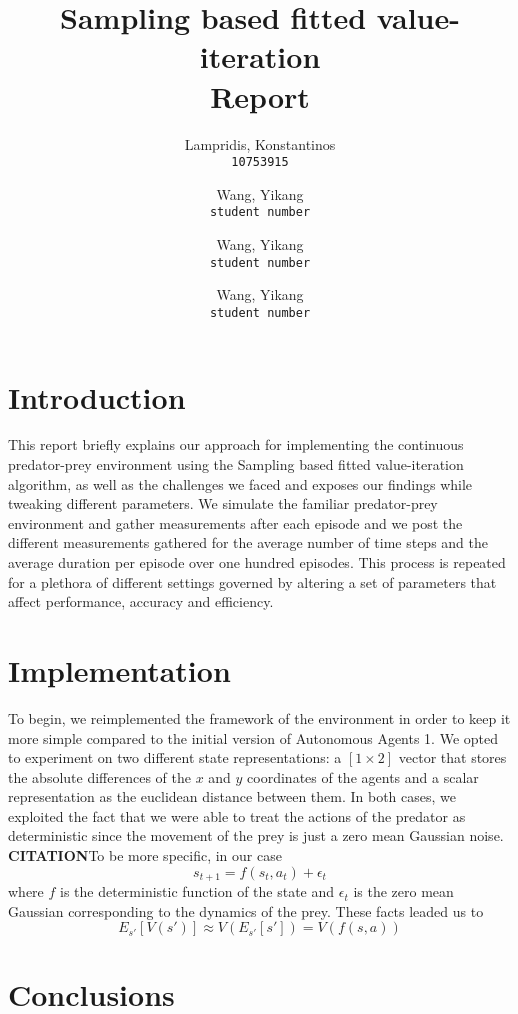 \documentclass{article}
\title{Sampling based fitted value-iteration\\Report}
\author{
  Lampridis, Konstantinos\\
  \texttt{10753915}
  \and
  Wang, Yikang\\
  \texttt{student number}
  \and
  Wang, Yikang\\
  \texttt{student number}
  \and
  Wang, Yikang\\
  \texttt{student number}
}
\begin{document}
  \maketitle


\section{Introduction}

This report briefly explains our approach for implementing the continuous predator-prey environment using the Sampling based fitted value-iteration algorithm, as well as the challenges we faced and exposes our findings while tweaking different parameters. We simulate the familiar predator-prey environment and gather measurements after each episode and we post the different measurements gathered for the average number of time steps and the average duration per episode over one hundred episodes. This process is repeated for a plethora of different settings governed by altering a set of parameters that affect performance, accuracy and efficiency.


\section{Implementation}

To begin, we reimplemented the framework of the environment in order to keep it more simple compared to the initial version of Autonomous Agents 1. We opted to experiment on two different state representations: a $[1\times2]$ vector that stores the absolute differences of the $x$ and $y$ coordinates of the agents and a scalar representation as the euclidean distance between them. In both cases, we exploited the fact that we were able to treat the actions of the predator as deterministic since the movement of the prey is just a zero mean Gaussian noise. \textbf{CITATION}To be more specific, in our case
\[s_{t+1} = f(s_t, a_t) + \epsilon_t\]
where $f$ is the deterministic function of the state and $\epsilon_t$ is the zero mean Gaussian corresponding to the dynamics of the prey. These facts leaded us to
\[E_{s'}[V(s')] \approx V(E_{s'}[s']) = V(f(s,a))\]


\section{Conclusions}




\end{document}

